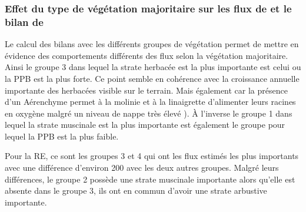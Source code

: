 \subsubsection{Effet du type de végétation majoritaire sur les flux de \coo et le bilan de \coo }
Le calcul des bilans avec les différents groupes de végétation permet de mettre en évidence des comportements différents des flux selon la végétation majoritaire.
Ainsi le groupe 3 dans lequel la strate herbacée est la plus importante est celui ou la PPB est la plus forte.
Ce point semble en cohérence avec la croissance annuelle importante des herbacées visible sur le terrain.
Mais également car la présence d'un Aérenchyme permet à la molinie et à la linaigrette d'alimenter leurs racines en oxygène malgré un niveau de nappe très élevé \citep{taylor2001,rydin2003c}).
À l'inverse le groupe 1 dans lequel la strate muscinale est la plus importante est également le groupe pour lequel la PPB est la plus faible.
\plop

Pour la RE, ce sont les groupes 3 et 4 qui ont les flux estimés les plus importants avec une différence d'environ \SI{200}{\gcma} avec les deux autres groupes.
Malgré leurs différences, le groupe 2 possède une strate muscinale importante alors qu'elle est absente dans le groupe 3, ils ont en commun d'avoir une strate arbustive importante.

%
%

